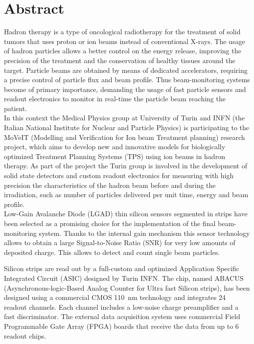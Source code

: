
\chapter*{Abstract}
\thispagestyle{plain}
Hadron therapy is a type of oncological radiotherapy for the treatment of solid tumors that uses proton or
ion beams instead of conventional X-rays. The usage of hadron particles allows a better control on the energy release,
improving the precision of the treatment and the conservation of healthy tissues around the target.
Particle beams are obtained by means of dedicated accelerators, requiring a precise control of particle flux and beam profile.
Thus beam-monitoring systems become of primary importance, demanding the usage of fast particle sensors and readout electronics to monitor
in real-time the particle beam reaching the patient.\\

\noindent In this context the Medical Physics group at University of Turin and INFN (the Italian National Institute for
Nuclear and Particle Physics) is participating to the MoVeIT (Modelling and Verification for Ion beam Treatment planning) research project, which aims to develop new and
innovative models for biologically optimized Treatment Planning Systems (TPS) using ion beams in hadron therapy.
As part of the project the Turin group is involved in the development of solid state detectors and custom readout electronics for measuring with high precision
the characteristics of the hadron beam before and during the irradiation, such as number of particles delivered per unit time, energy and beam profile.\\

\noindent Low-Gain Avalanche Diode (LGAD) thin silicon sensors segmented in strips have been selected as a promising choice for the implementation
of the final beam-monitoring system. Thanks to the internal gain mechanism this sensor technology allows to obtain a large
Signal-to-Noise Ratio (SNR) for very low amounts of deposited charge. This allows to detect and count single beam particles.

\noindent Silicon strips are read out by a full-custom and optimized Application Specific Integrated Circuit (ASIC) designed by Turin INFN.
The chip, named ABACUS (Asynchronous-logic-Based Analog Counter for Ultra fast Silicon strips), has been 
designed using a commercial CMOS 110~nm technology and integrates 24 readout channels. Each channel includes a low-noise charge preamplifier 
and a fast discriminator. The external data acquisition system uses commercial Field Programmable Gate Array (FPGA) boards that receive
the data from up to 6 readout chips.\\%

